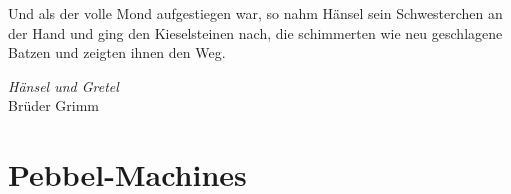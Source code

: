 \documentclass[draft,oneside]{scrartcl}
\begin{document}
\epigraph{Und als der volle Mond aufgestiegen war, so nahm Hänsel sein %
Schwesterchen an der Hand und ging den Kieselsteinen nach, die schimmerten wie %
neu geschlagene Batzen und zeigten ihnen den Weg.}%
{\emph{Hänsel und Gretel}\\Brüder Grimm}
\section{Pebbel-Machines}

\printbibliography
\end{document}
